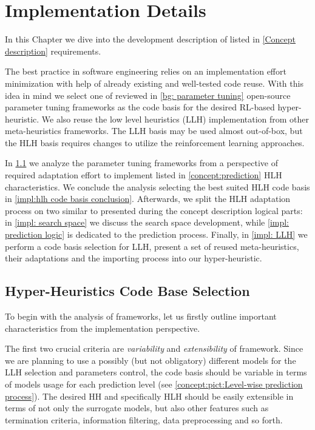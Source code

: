 \chapter{Implementation Details}\label{impl}
In this Chapter we dive into the development description of listed in \cref{Concept description} requirements.
 
The best practice in software engineering relies on an implementation effort minimization with help of already existing and well-tested code reuse. With this idea in mind we select one of reviewed in \cref{bg: parameter tuning} open-source parameter tuning frameworks as the code basis for the desired RL-based hyper-heuristic. We also reuse the low level heuristics (LLH) implementation from other meta-heuristics frameworks. The LLH basis may be used almost out-of-box, but the HLH basis requires changes to utilize the reinforcement learning approaches.

In \cref{impl:hlh code basis section} we analyze the parameter tuning frameworks from a perspective of required adaptation effort to implement listed in \cref{concept:prediction} HLH characteristics. We conclude the analysis selecting the best suited HLH code basis in \cref{impl:hlh code basis conclusion}. Afterwards, we split the HLH adaptation process on two similar to presented during the concept description logical parts: in \cref{impl: search space} we discuss the search space development, while \cref{impl: prediction logic} is dedicated to the prediction process. Finally, in \cref{impl: LLH} we perform a code basis selection for LLH, present a set of reused meta-heuristics, their adaptations and the importing process into our hyper-heuristic.


\section{Hyper-Heuristics Code Base Selection}\label{impl:hlh code basis section}
To begin with the analysis of frameworks, let us firstly outline important characteristics from the implementation perspective.

The first two crucial criteria are \emph{variability} and \emph{extensibility} of framework. Since we are planning to use a possibly (but not obligatory) different models for the LLH selection and parameters control, the code basis should be variable in terms of models usage for each prediction level (see \cref{concept:pict:Level-wise prediction process}). The desired HH and specifically HLH should be easily extensible in terms of not only the surrogate models, but also other features such as termination criteria, information filtering, data preprocessing and so forth.

